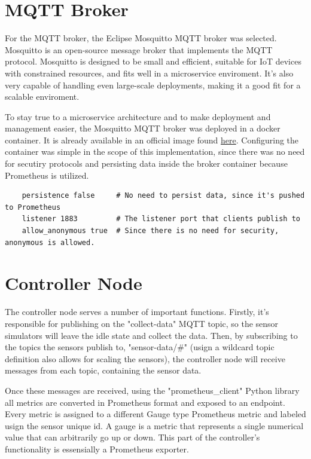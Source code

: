 \section{MQTT Broker}
For the MQTT broker, the Eclipse Mosquitto MQTT broker was selected. Mosquitto is an open-source message broker that implements the MQTT protocol. Mosquitto is designed to be small and efficient, suitable for IoT devices with constrained resources, and fits well in a microservice enviroment. It's also very capable of handling even large-scale deployments, making it a good fit for a scalable enviroment.

To stay true to a microservice architecture and to make deployment and management easier, the Mosquitto MQTT broker was deployed in a docker container. It is already available in an official image found \href{https://hub.docker.com/_/eclipse-mosquitto}{here}. Configuring the container was simple in the scope of this implementation, since there was no need for secutiry protocols and persisting data inside the broker container because Prometheus is utilized.

\begin{verbatim}
    persistence false     # No need to persist data, since it's pushed to Prometheus
    listener 1883         # The listener port that clients publish to
    allow_anonymous true  # Since there is no need for security, anonymous is allowed.
\end{verbatim}

\section{Controller Node}
The controller node serves a number of important functions. Firstly, it's responsible for publishing on the "collect-data" MQTT topic, so the sensor simulators will leave the idle state and collect the data. Then, by subscribing to the topics the sensors publish to, "sensor-data/\#" (usign a wildcard topic definition also allows for scaling the sensors), the controller node will receive messages from each topic, containing the sensor data.

Once these messages are received, using the "prometheus\_client" Python library all metrics are converted in Prometheus format and exposed to an endpoint. Every metric is assigned to a different Gauge type Prometheus metric and labeled usign the sensor unique id. A gauge is a metric that represents a single numerical value that can arbitrarily go up or down. This part of the controller's functionality is essensially a Prometheus exporter.

